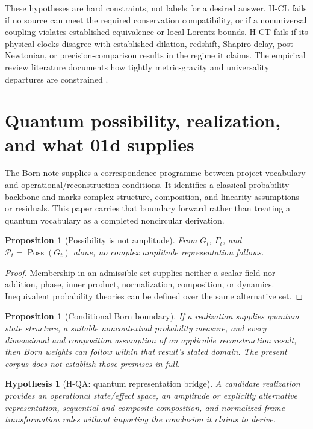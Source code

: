 \documentclass[11pt,a4paper]{article}
\newtheorem{proposition}[definition]{Proposition}
\newtheorem{hypothesis}[definition]{Hypothesis}
\theoremstyle{remark}
\newcommand{\Poss}{\mathcal P}
\begin{document}
These hypotheses are hard constraints, not labels for a desired answer. H-CL
fails if no source can meet the required conservation compatibility, or if a
nonuniversal coupling violates established equivalence or local-Lorentz bounds.
H-CT fails if its physical clocks disagree with established dilation, redshift,
Shapiro-delay, post-Newtonian, or precision-comparison results in the regime it
claims. The empirical review literature documents how tightly metric-gravity and
universality departures are constrained \citep{will2014}.

\section{Quantum possibility, realization, and what 01d supplies}\label{sec:quantum}
The Born note supplies a correspondence programme between project vocabulary and
operational/reconstruction conditions. It identifies a classical probability
backbone and marks complex structure, composition, and linearity assumptions or
residuals. This paper carries that boundary forward rather than treating a
quantum vocabulary as a completed noncircular derivation.

\begin{proposition}[Possibility is not amplitude]\label{prop:no-amplitude}
From $G_t$, $\Gamma_t$, and $\Poss_t=\operatorname{Poss}(G_t)$ alone, no complex
amplitude representation follows.
\end{proposition}
\begin{proof}
Membership in an admissible set supplies neither a scalar field nor addition,
phase, inner product, normalization, composition, or dynamics. Inequivalent
probability theories can be defined over the same alternative set.
\end{proof}

\begin{proposition}[Conditional Born boundary]\label{prop:born-boundary}
If a realization supplies quantum state structure, a suitable noncontextual
probability measure, and every dimensional and composition assumption of an
applicable reconstruction result, then Born weights can follow within that
result's stated domain. The present corpus does not establish those premises in
full.
\end{proposition}

\begin{hypothesis}[H-QA: quantum representation bridge]\label{hyp:quantum}
A candidate realization provides an operational state/effect space, an amplitude
or explicitly alternative representation, sequential and composite composition,
and normalized frame-transformation rules without importing the conclusion it
claims to derive.
\end{hypothesis}
\end{document}
